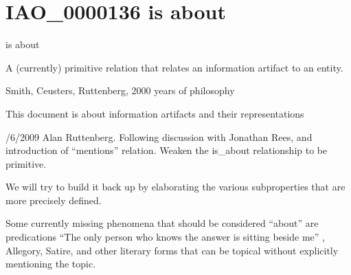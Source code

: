 \documentclass[letterpaper,10pt,english]{sphinxmanual}
\begin{document}
\section{IAO\_0000136 \sphinxhyphen{} is about}
\label{\detokenize{doc-IAO_0000136:iao-0000136-is-about}}\label{\detokenize{doc-IAO_0000136:index-0}}\label{\detokenize{doc-IAO_0000136::doc}}
\begin{sphinxShadowBox}

\sphinxAtStartPar
is about
\end{sphinxShadowBox}

\begin{sphinxShadowBox}

\sphinxAtStartPar
A (currently) primitive relation that relates an information artifact to an entity.
\end{sphinxShadowBox}

\begin{sphinxShadowBox}

\sphinxAtStartPar
Smith, Ceusters, Ruttenberg, 2000 years of philosophy
\end{sphinxShadowBox}

\begin{sphinxShadowBox}

\sphinxAtStartPar
This document is about information artifacts and their representations
\end{sphinxShadowBox}

\begin{sphinxShadowBox}

/6/2009 Alan Ruttenberg. Following discussion with Jonathan Rees, and introduction of “mentions” relation. Weaken the is\_about relationship to be primitive.

\sphinxAtStartPar
We will try to build it back up by elaborating the various subproperties that are more precisely defined.

\sphinxAtStartPar
Some currently missing phenomena that should be considered “about” are predications \sphinxhyphen{} “The only person who knows the answer is sitting beside me” , Allegory, Satire, and other literary forms that can be topical without explicitly mentioning the topic.
\end{sphinxShadowBox}

\begin{sphinxShadowBox}

\sphinxAtStartPar
{}
\end{sphinxShadowBox}
\end{document}
